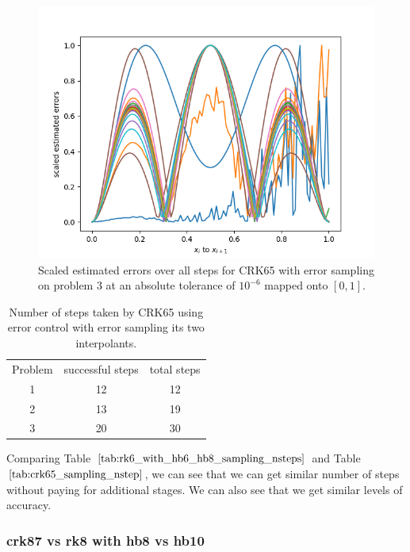 \begin{figure}[H]
\centering
\includegraphics[width=0.7\linewidth]{./figures/crk65_sampling_p3_scaled_estimated_errors}
\caption{Scaled estimated errors over all steps for CRK65 with error sampling on problem 3 at an absolute tolerance of $10^{-6}$ mapped onto $[0, 1]$.}
\label{fig:crk65_sampling_p3_scaled_estimated_errors}
\end{figure}

\begin{table}[h]
\caption {Number of steps taken by CRK65 using error control with error sampling its two interpolants.} \label{tab:crk65_sampling_nsteps}
\begin{center}
\begin{tabular}{ c c c } 
Problem & successful steps & total steps \\ 
1       & 12               & 12 \\ 
2       & 13               & 19 \\
3       & 20               & 30 \\
\end{tabular}
\end{center}
\end{table}

Comparing Table $\ref{tab:rk6_with_hb6_hb8_sampling_nsteps}$ and Table $\ref{tab:crk65_sampling_nstep}$, we can see that we can get similar number of steps without paying for additional stages. We can also see that we get similar levels of accuracy.

\subsubsection{crk87 vs rk8 with hb8 vs hb10}

